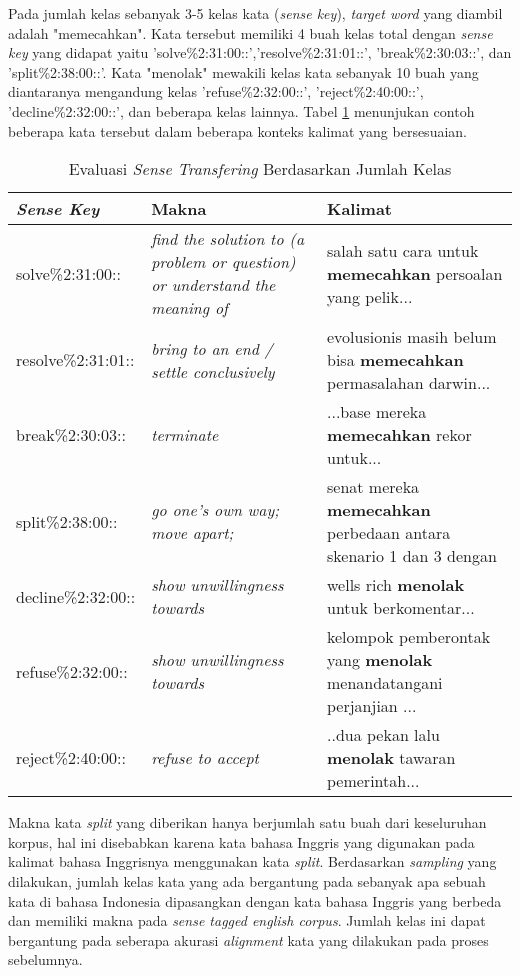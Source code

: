 Pada jumlah kelas sebanyak 3-5 kelas kata (\textit{sense key}), \textit{target word} yang diambil adalah "memecahkan". Kata tersebut memiliki 4 buah kelas total dengan \textit{sense key} yang didapat yaitu 'solve\%2:31:00::','resolve\%2:31:01::', 'break\%2:30:03::', dan 'split\%2:38:00::'. Kata "menolak" mewakili kelas kata sebanyak 10 buah yang diantaranya mengandung kelas 'refuse\%2:32:00::', 'reject\%2:40:00::', 'decline\%2:32:00::', dan beberapa kelas lainnya. Tabel \ref{table:number-classes-sense-transfering-evaluation} menunjukan contoh beberapa kata tersebut dalam beberapa konteks kalimat yang bersesuaian.

\begin{table}
	\centering
	\caption{Evaluasi \textit{Sense Transfering} Berdasarkan Jumlah Kelas}
	\label{table:number-classes-sense-transfering-evaluation}
	\begin{tabular}{|p{4cm}|p{4cm}|p{4cm}|}
		\hline
		\textit{Sense Key} & Makna & Kalimat
		\\ \hline
		solve\%2:31:00::  & 
		\textit{find the solution to (a problem or question) or understand the meaning of}   & 
		salah satu cara untuk \textbf{memecahkan} persoalan yang pelik...
		\\ \hline
		resolve\%2:31:01:: & 
		\textit{bring to an end / settle conclusively}   & 
		evolusionis masih belum bisa \textbf{memecahkan} permasalahan darwin...
		\\ \hline
		break\%2:30:03:: & 
		\textit{terminate}   & 
		...base mereka \textbf{memecahkan} rekor untuk...
		\\ \hline
		split\%2:38:00:: &
		\textit{go one's own way; move apart;} &
		senat mereka \textbf{memecahkan} perbedaan antara skenario 1 dan 3 dengan
		\\ \hline
		decline\%2:32:00:: &
		\textit{show unwillingness towards} &
		wells rich \textbf{menolak} untuk berkomentar...
		\\ \hline
		refuse\%2:32:00:: &
		\textit{show unwillingness towards} &
		kelompok pemberontak yang \textbf{menolak} menandatangani perjanjian ...
		\\ \hline
		reject\%2:40:00:: &
		\textit{refuse to accept} &
		..dua pekan lalu \textbf{menolak} tawaran pemerintah...
		\\ \hline
	\end{tabular}
\end{table}

Makna kata \textit{split} yang diberikan hanya berjumlah satu buah dari keseluruhan korpus, hal ini disebabkan karena kata bahasa Inggris yang digunakan pada kalimat bahasa Inggrisnya menggunakan kata \textit{split}. Berdasarkan \textit{sampling} yang dilakukan, jumlah kelas kata yang ada bergantung pada sebanyak apa sebuah kata di bahasa Indonesia dipasangkan dengan kata bahasa Inggris yang berbeda dan memiliki makna pada \textit{sense tagged english corpus}. Jumlah kelas ini dapat bergantung pada seberapa akurasi \textit{alignment} kata yang dilakukan pada proses sebelumnya.

